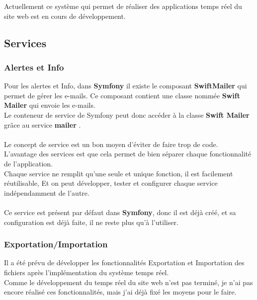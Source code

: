 \documentclass[12pt]{article}
\begin{document}
Actuellement ce système qui permet de réaliser des applications temps réel du site web est en cours de développement.\\

\subsection{Services }

\subsubsection{Alertes et Info}

Pour les alertes et Info, dans \textbf{Symfony} il existe le composant \textbf{SwiftMailer} qui permet de gérer les e-mails. Ce composant contient une classe nommée \textbf{Swift Mailer} qui envoie  les e-mails. \\
 Le conteneur de service de Symfony peut donc accéder à la classe \textbf{Swift Mailer}  grâce au service \textbf{mailer} .\\
 \\
 
 Le concept de service est un bon moyen d'éviter de faire trop de code.\\
 L'avantage des services est que cela permet de bien séparer chaque fonctionnalité de l'application. \\
 Chaque service ne remplit qu'une seule et unique fonction, il est facilement réutilisable, Et on peut  développer, tester et configurer chaque service indépendamment de l'autre. \\ \\
 
Ce service est présent par défaut dans \textbf{Symfony}, donc il est déjà créé, et sa configuration est déjà faite, il ne reste plus qu'à l'utiliser.

\subsubsection{Exportation/Importation}
 
Il a été prévu de  développer les fonctionnalités Exportation et Importation des fichiers après l'implémentation du système temps réel.\\
Comme le développement du temps réel du site web n'est pas terminé, je n'ai pas encore réalisé ces fonctionnalités, mais j'ai déjà fixé
les moyens pour le faire.\\ \\
\end{document}
